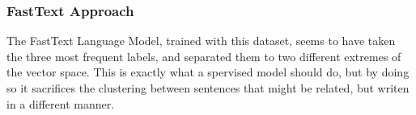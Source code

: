 \subsubsection{FastText Approach}
The FastText Language Model, trained with this dataset, seems to have taken the three most frequent labels, and separated them to two different extremes of the vector space. This is exactly what a spervised model should do, but by doing so it sacrifices the clustering between sentences that might be related, but writen in a different manner.
